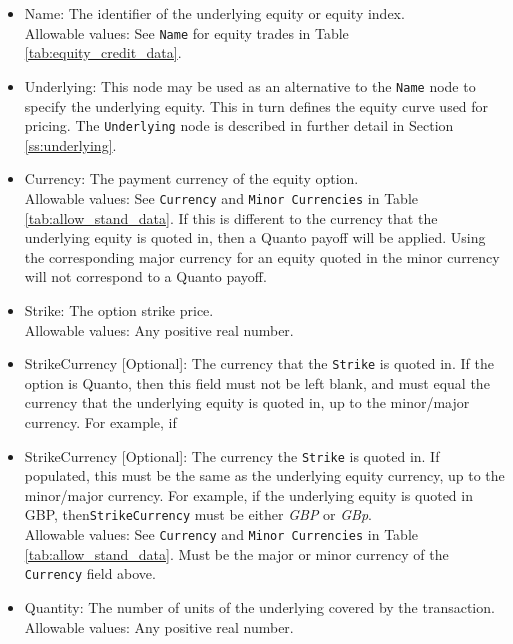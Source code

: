 \begin{itemize}
	\item Name: The identifier of the underlying equity or equity index. \\
	Allowable values: See \lstinline!Name! for equity trades in Table \ref{tab:equity_credit_data}.
	\item Underlying: This node may be used as an alternative to the \lstinline!Name! node to
	specify the underlying equity. This in turn defines the equity curve used for pricing. The
	\lstinline!Underlying! node is described in further detail in Section \ref{ss:underlying}. \\
	\item Currency: The payment currency of the equity option. \\
	Allowable values: See \lstinline!Currency! and \lstinline!Minor Currencies! in Table
	\ref{tab:allow_stand_data}.	If this is different to the currency that the underlying equity
	is quoted in, then a Quanto payoff will be applied. Using the corresponding major currency
	for an equity quoted in the minor currency will not correspond to a Quanto payoff.
	\item Strike: The option strike price.\\
	Allowable values: Any positive real number.	
	\item StrikeCurrency [Optional]: The currency that the \lstinline!Strike! is quoted in. If
	the option is Quanto, then this field must not be left blank, and must equal the currency
	that the underlying equity is quoted in, up to the minor/major currency. For example, if 
	\item StrikeCurrency [Optional]: The currency the \lstinline!Strike! is quoted in. If
	populated, this must be the same as the underlying equity currency, up to the minor/major
	currency. For example, if the underlying equity is quoted in GBP, then\lstinline!StrikeCurrency!
	must be either \emph{GBP} or \emph{GBp}. \\
	Allowable values: See \lstinline!Currency! and \lstinline!Minor Currencies! in Table
	\ref{tab:allow_stand_data}.	Must be the major or minor currency of the \lstinline!Currency!
	field above.
	\item Quantity: The number of units of the underlying covered by the transaction. \\
	Allowable values: Any positive real number.
\end{itemize}
